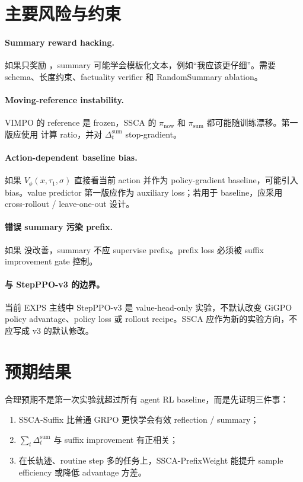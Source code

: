 \documentclass[10pt]{ctexart}
\begin{document}
\section{主要风险与约束}
\paragraph{Summary reward hacking.}
如果只奖励 ，summary 可能学会模板化文本，例如“我应该更仔细”。需要 schema、长度约束、factuality verifier 和 RandomSummary ablation。

\paragraph{Moving-reference instability.}
VIMPO 的 reference 是 frozen，SSCA 的 $\pi_{\mathrm{now}}$ 和 $\pi_{\mathrm{sum}}$ 都可能随训练漂移。第一版应使用  计算 ratio，并对 $\Delta_t^{\mathrm{sum}}$ stop-gradient。

\paragraph{Action-dependent baseline bias.}
如果 $V_\phi(x,\tau_1,\sigma)$ 直接看当前 action 并作为 policy-gradient baseline，可能引入 bias。value predictor 第一版应作为 auxiliary loss；若用于 baseline，应采用 cross-rollout / leave-one-out 设计。

\paragraph{错误 summary 污染 prefix.}
如果  没改善，summary 不应 supervise prefix。prefix loss 必须被 suffix improvement gate 控制。

\paragraph{与 StepPPO-v3 的边界。}
当前 EXPS 主线中 StepPPO-v3 是 value-head-only 实验，不默认改变 GiGPO policy advantage、policy loss 或 rollout recipe。SSCA 应作为新的实验方向，不应写成 v3 的默认修改。

\section{预期结果}
合理预期不是第一次实验就超过所有 agent RL baseline，而是先证明三件事：
\begin{enumerate}
  \item SSCA-Suffix 比普通 GRPO 更快学会有效 reflection / summary；
  \item $\sum_t\Delta_t^{\mathrm{sum}}$ 与 suffix improvement 有正相关；
  \item 在长轨迹、routine step 多的任务上，SSCA-PrefixWeight 能提升 sample efficiency 或降低 advantage 方差。
\end{enumerate}
\end{document}
